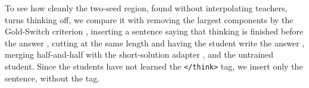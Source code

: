 To see how cleanly the two-seed region, found without interpolating teachers, turns thinking off, we compare it with removing the largest components by the Gold-Switch criterion \citep{lee2025goldswitch}, inserting a sentence saying that thinking is finished before the answer \citep{ma2025nothinking}, cutting at the same length and having the student write the answer \citep{muennighoff2025s1}, merging half-and-half with the short-solution adapter \citep{wu2025merging}, and the untrained student.
Since the students have not learned the \texttt{</think>} tag, we insert only the sentence, without the tag.
